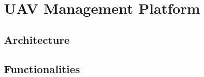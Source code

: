 \chapter{UAV Management Platform}
\label{chapter:uav-management-framework}

\section{Architecture}
\label{sec:architecture}

\section{Functionalities}
\label{sec:functionalities}

